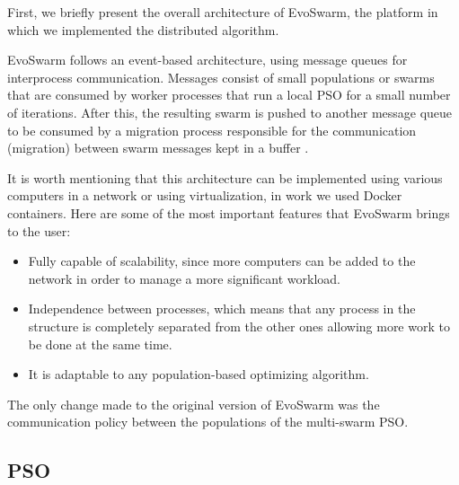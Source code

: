 \documentclass[runningheads]{llncs}
\begin{document}
First, we briefly present the overall architecture of EvoSwarm, the 
platform in which we implemented the distributed algorithm. 

EvoSwarm follows an event-based architecture, using message queues for
interprocess communication. Messages consist of small populations or swarms that
are consumed by worker processes that run a local PSO for a small number of
iterations. After this, the resulting swarm is pushed to another message queue
to be consumed by a migration process responsible for the communication
(migration) between swarm messages kept in a buffer \cite{b18}.



It is worth mentioning that this architecture can be implemented using various
computers in a network or using virtualization, in work we used Docker containers. 
Here are some of the most important features that
EvoSwarm brings to the user:

\begin{itemize} 
  
  \item Fully capable of scalability, since more computers can be added to the
  network in order to manage a more significant workload.
    
    \item Independence between processes, which means that any process in the
    structure is completely separated from the other ones allowing more work to
    be done at the same time.
    
    \item It is adaptable to any population-based optimizing algorithm.
\end{itemize}

The only change made to the original version of EvoSwarm \cite{b18} was the communication policy between the
populations of the multi-swarm PSO.

\subsection{PSO} 
\end{document}

